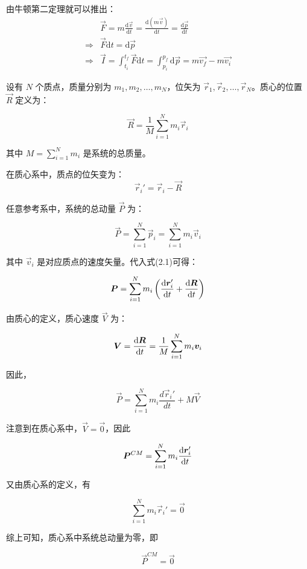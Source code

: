 \begin{prove}

    由牛顿第二定理就可以推出：
    \begin{equation}
        \begin{aligned}
                            & \vec{F}=m\frac{\mathrm{d}\vec{v}}{\mathrm{d}t}=\frac{\mathrm{d}(m\vec{v})}{\mathrm{d}t}=\frac{\mathrm{d}\vec{p}}{\mathrm{d}t} \\
            \Longrightarrow & \vec{F}\mathrm{d}t=\mathrm{d}\vec{p}                                                                                          \\
            \Longrightarrow & \vec{I}=\int_{t_{i}}^{t_{f}}\vec{F}\mathrm{d}t= \int_{p_{i}}^{p_{f}}\mathrm{d}\vec{p}=m\vec{v_{f}}-m\vec{v_{i}}
        \end{aligned}
        \nonumber
    \end{equation}
\end{prove}
\begin{prove}
    设有 \( N \) 个质点，质量分别为 \( m_1, m_2, \ldots, m_N \)，位矢为 \( \vec{r}_1, \vec{r}_2, \ldots, \vec{r}_N \)。质心的位置 \(\vec{R}\) 定义为：

    \[
        \vec{R} = \frac{1}{M} \sum_{i=1}^{N} m_i \vec{r}_i
    \]

    其中 \( \displaystyle M = \sum_{i=1}^{N} m_i \) 是系统的总质量。

    在质心系中，质点的位矢变为：
    \begin{equation}
        \vec{r}_i' = \vec{r}_i - \vec{R}
    \end{equation}

    任意参考系中，系统的总动量 \(\vec{P}\) 为：

    \[
        \vec{P} = \sum_{i=1}^{N} \vec{p}_i = \sum_{i=1}^{N} m_i \vec{v}_i
    \]

    其中 \(\vec{v}_i\) 是对应质点的速度矢量。代入式(2.1)可得：

    \[
        \vec{P} = \sum_{i=1}^{N} m_i \left(\frac{\dif\vec{r}_i'}{\dif t} + \frac{\dif\vec{R}}{\dif t}\right)
    \]

    由质心的定义，质心速度 \(\vec{V}\) 为：

    \[
        \vec{V} = \frac{\dif \vec{R}}{\dif t} = \frac{1}{M} \sum_{i=1}^{N} m_i \vec{v}_i
    \]

    因此，

    \[
        \vec{P} = \sum_{i=1}^{N} m_i \frac{d\vec{r}_i'}{dt} + M \vec{V}
    \]

    注意到在质心系中，\(\vec{V} = \vec{0}\)，因此

    \[
        \vec{P}^{CM} = \sum_{i=1}^{N} m_i \frac{\dif\vec{r}_i'}{\dif t}
    \]

    又由质心系的定义，有

    \[
        \sum_{i=1}^{N} m_i \vec{r}_i' = \vec{0}
    \]

    综上可知，质心系中系统总动量为零，即

    \[
        \vec{P}^{CM} = \vec{0}
    \]
\end{prove}
